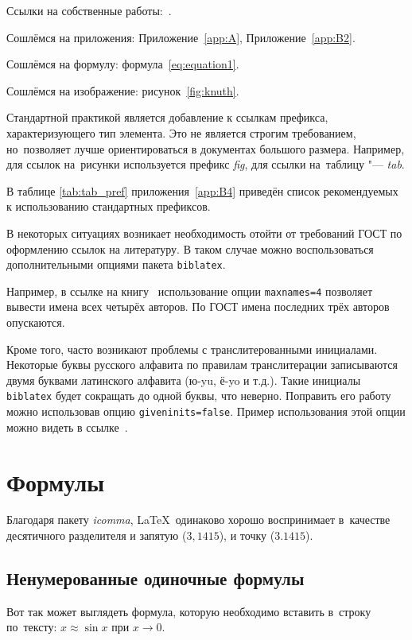 Ссылки на собственные работы:~\cite{scopus_rvect}.

Сошлёмся на приложения: Приложение~\cref{app:A}, Приложение~\cref{app:B2}.

Сошлёмся на формулу: формула~\cref{eq:equation1}.

Сошлёмся на изображение: рисунок~\cref{fig:knuth}.

Стандартной практикой является добавление к ссылкам префикса, характеризующего тип элемента.
Это не является строгим требованием, но~позволяет лучше ориентироваться в документах большого размера.
Например, для ссылок на~рисунки используется префикс \textit{fig},
для ссылки на~таблицу "--- \textit{tab}.

В таблице \cref{tab:tab_pref} приложения~\cref{app:B4} приведён список рекомендуемых
к использованию стандартных префиксов.

В некоторых ситуациях возникает необходимость отойти от требований ГОСТ по оформлению ссылок на
литературу.
В таком случае можно воспользоваться дополнительными опциями пакета \verb+biblatex+.

Например, в ссылке на книгу~\cite{sobenin_kdv} использование опции \verb+maxnames=4+ позволяет
вывести имена всех четырёх авторов.
По ГОСТ имена последних трёх авторов опускаются.

Кроме того, часто возникают проблемы с транслитерованными инициалами. Некоторые буквы русского
алфавита по правилам транслитерации записываются двумя буквами латинского алфавита (ю-yu, ё-yo и
т.д.).
Такие инициалы \verb+biblatex+ будет сокращать до одной буквы, что неверно.
Поправить его работу можно использовав опцию \verb+giveninits=false+.
Пример использования этой опции можно видеть в ссылке~\cite{initials}.

\section{Формулы}\label{sec:ch1/sec3}

Благодаря пакету \textit{icomma}, \LaTeX~одинаково хорошо воспринимает
в~качестве десятичного разделителя и запятую (\(3,1415\)), и точку (\(3.1415\)).

\subsection{Ненумерованные одиночные формулы}\label{subsec:ch1/sec3/sub1}

Вот так может выглядеть формула, которую необходимо вставить в~строку
по~тексту: \(x \approx \sin x\) при \(x \to 0\).

